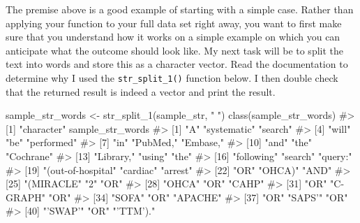 \documentclass[
  letterpaper,
]{krantz}
\makeatletter
\newenvironment{Shaded}{\begin{snugshade}}{\end{snugshade}}
\newcommand{\CommentTok}[1]{\textcolor[rgb]{0.37,0.37,0.37}{#1}}
\newcommand{\FunctionTok}[1]{\textcolor[rgb]{0.28,0.35,0.67}{#1}}
\newcommand{\NormalTok}[1]{\textcolor[rgb]{0.00,0.23,0.31}{#1}}
\newcommand{\OtherTok}[1]{\textcolor[rgb]{0.00,0.23,0.31}{#1}}
\newcommand{\StringTok}[1]{\textcolor[rgb]{0.13,0.47,0.30}{#1}}
\newenvironment{kframe}{%
\medskip{}
\setlength{\fboxsep}{.8em}
 \def\at@end@of@kframe{}%
 \ifinner\ifhmode%
  \def\at@end@of@kframe{\end{minipage}}%
  \begin{minipage}{\columnwidth}%
 \fi\fi%
 \def\FrameCommand##1{\hskip\@totalleftmargin \hskip-\fboxsep
 \colorbox{shadecolor}{##1}\hskip-\fboxsep
     \hskip-\linewidth \hskip-\@totalleftmargin \hskip\columnwidth}%
 \MakeFramed {\advance\hsize-\width
   \@totalleftmargin\z@ \linewidth\hsize
   \@setminipage}}%
 {\par\unskip\endMakeFramed%
 \at@end@of@kframe}
\renewenvironment{Shaded}{\begin{kframe}}{\end{kframe}}
\makeatother
\begin{document}
The premise above is a good example of starting with a simple case.
Rather than applying your function to your full data set right away, you
want to first make sure that you understand how it works on a simple
example on which you can anticipate what the outcome should look like.
My next task will be to split the text into words and store this as a
character vector. Read the documentation to determine why I used the
\texttt{str\_split\_1()} function below. I then double check that the
returned result is indeed a vector and print the result.

\begin{Shaded}
\begin{Highlighting}[]
\NormalTok{sample\_str\_words }\OtherTok{\textless{}{-}} \FunctionTok{str\_split\_1}\NormalTok{(sample\_str, }\StringTok{" "}\NormalTok{)}
\FunctionTok{class}\NormalTok{(sample\_str\_words)}
\CommentTok{\#\textgreater{} [1] "character"}
\NormalTok{sample\_str\_words}
\CommentTok{\#\textgreater{}  [1] "A"                 "systematic"        "search"           }
\CommentTok{\#\textgreater{}  [4] "will"              "be"                "performed"        }
\CommentTok{\#\textgreater{}  [7] "in"                "PubMed,"           "Embase,"          }
\CommentTok{\#\textgreater{} [10] "and"               "the"               "Cochrane"         }
\CommentTok{\#\textgreater{} [13] "Library,"          "using"             "the"              }
\CommentTok{\#\textgreater{} [16] "following"         "search"            "query:"           }
\CommentTok{\#\textgreater{} [19] "(\textquotesingle{}out{-}of{-}hospital" "cardiac"           "arrest\textquotesingle{}"          }
\CommentTok{\#\textgreater{} [22] "OR"                "\textquotesingle{}OHCA\textquotesingle{})"           "AND"              }
\CommentTok{\#\textgreater{} [25] "(\textquotesingle{}MIRACLE"         "2\textquotesingle{}"                "OR"               }
\CommentTok{\#\textgreater{} [28] "\textquotesingle{}OHCA\textquotesingle{}"            "OR"                "\textquotesingle{}CAHP\textquotesingle{}"           }
\CommentTok{\#\textgreater{} [31] "OR"                "\textquotesingle{}C{-}GRAPH\textquotesingle{}"         "OR"               }
\CommentTok{\#\textgreater{} [34] "\textquotesingle{}SOFA\textquotesingle{}"            "OR"                "\textquotesingle{}APACHE\textquotesingle{}"         }
\CommentTok{\#\textgreater{} [37] "OR"                "\textquotesingle{}SAPS’"            "OR"               }
\CommentTok{\#\textgreater{} [40] "’SWAP’"            "OR"                "’TTM’)."}
\end{Highlighting}
\end{Shaded}
\end{document}
